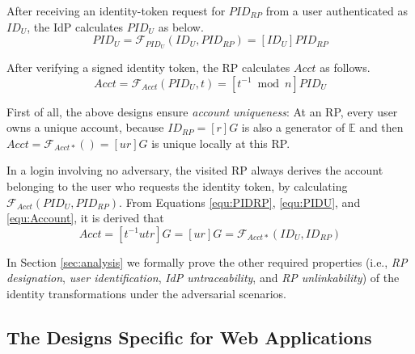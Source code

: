 After receiving an identity-token request for $PID_{RP}$ from a user authenticated as $ID_U$, the IdP calculates $PID_{U}$ as below.
\begin{equation}
PID_{U} = \mathcal{F}_{PID_U}(ID_U, PID_{RP}) =
  [{ID_U}]{PID_{RP}}
 \label{equ:PIDU}
\end{equation}


After verifying a signed identity token, the RP calculates $Acct$ as follows.
\begin{equation}
Acct = \mathcal{F}_{Acct}(PID_{U},t)
   = [t^{-1} \bmod n]PID_{U}
   \label{equ:Account}
\end{equation}

First of all, the above designs ensure \emph{account uniqueness}:
    At an RP, every user owns a unique account, because $ID_{RP} = [r]G$ is also a generator of $\mathbb{E}$ and then
     $Acct = \mathcal{F}_{Acct\ast}()=[ur]G$ is unique locally at this RP.

In a login involving no adversary,
 the visited RP always derives the account belonging to the user who requests the identity token,
    by calculating $\mathcal{F}_{Acct}(PID_{U}, PID_{RP})$.
From Equations \ref{equ:PIDRP}, \ref{equ:PIDU}, and \ref{equ:Account}, it is derived that
\begin{equation}
   Acct =  [t^{-1}utr]G = [ur]G = \mathcal{F}_{Acct\ast}(ID_U, ID_{RP})
   \label{equ:AccountNotChanged}
\end{equation}


In Section \ref{sec:analysis}
we formally prove the other required properties (i.e.,
    \emph{RP designation}, \emph{user identification}, \emph{IdP untraceability}, and \emph{RP unlinkability}) of the identity transformations under the adversarial scenarios.

\subsection{The Designs Specific for Web Applications}
\label{sec:web-design}

